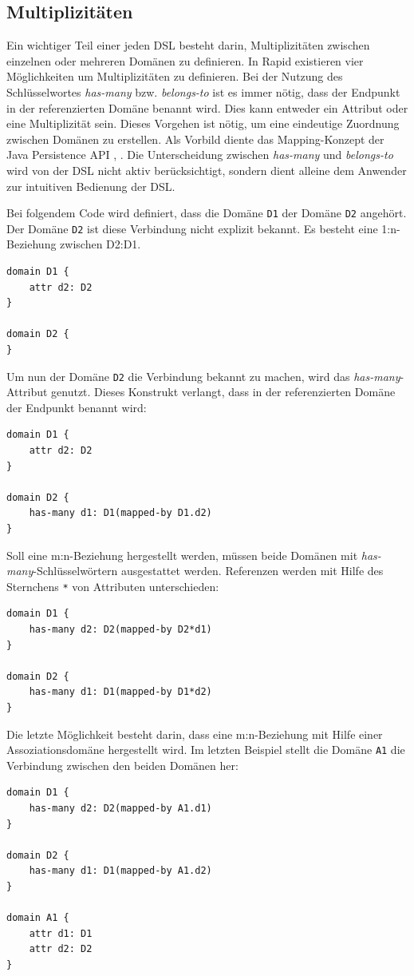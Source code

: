 \documentclass[a4paper,12pt]{scrreprt}
\begin{document}
\subsection{Multiplizitäten}
\label{sec:multiplizitaeten}
Ein wichtiger Teil einer jeden DSL besteht darin, Multiplizitäten zwischen einzelnen oder mehreren Domänen zu definieren. In Rapid existieren vier Möglichkeiten um Multiplizitäten zu definieren. Bei der Nutzung des Schlüsselwortes \textit{has-many} bzw. \textit{belongs-to} ist es immer nötig, dass der Endpunkt in der referenzierten Domäne benannt wird. Dies kann entweder ein Attribut oder eine Multiplizität sein. Dieses Vorgehen ist nötig, um eine eindeutige Zuordnung zwischen Domänen zu erstellen. Als Vorbild diente das Mapping-Konzept der Java Persistence API \cite{javaapi5ManyToMany}, \cite{javaapi5ManyToOne}.
Die Unterscheidung zwischen \textit{has-many} und \textit{belongs-to} wird von der DSL nicht aktiv berücksichtigt, sondern dient alleine dem Anwender zur intuitiven Bedienung der DSL.

Bei folgendem Code wird definiert, dass die Domäne \verb+D1+ der Domäne \verb+D2+ angehört. Der Domäne \verb+D2+ ist diese Verbindung nicht explizit bekannt. Es besteht eine 1:n-Beziehung zwischen D2:D1.
\begin{verbatim}
domain D1 {
    attr d2: D2
}

domain D2 {
}
\end{verbatim}

Um nun der Domäne \verb+D2+ die Verbindung bekannt zu machen, wird das \textit{has-many}-Attribut genutzt. Dieses Konstrukt verlangt, dass in der referenzierten Domäne der Endpunkt benannt wird:
\begin{verbatim}
domain D1 {
    attr d2: D2
}

domain D2 {
    has-many d1: D1(mapped-by D1.d2)
}
\end{verbatim}

Soll eine m:n-Beziehung hergestellt werden, müssen beide Domänen mit \textit{has-many}-Schlüsselwörtern ausgestattet werden. Referenzen werden mit Hilfe des Sternchens \verb+*+ von Attributen unterschieden:
\begin{verbatim}
domain D1 {
    has-many d2: D2(mapped-by D2*d1)
}

domain D2 {
    has-many d1: D1(mapped-by D1*d2)
}
\end{verbatim}

Die letzte Möglichkeit besteht darin, dass eine m:n-Beziehung mit Hilfe einer Assoziationsdomäne hergestellt wird. Im letzten Beispiel stellt die Domäne \verb+A1+ die Verbindung zwischen den beiden Domänen her:
\begin{verbatim}
domain D1 {
    has-many d2: D2(mapped-by A1.d1)
}

domain D2 {
    has-many d1: D1(mapped-by A1.d2)
}

domain A1 {
    attr d1: D1
    attr d2: D2
}
\end{verbatim}
\end{document}
